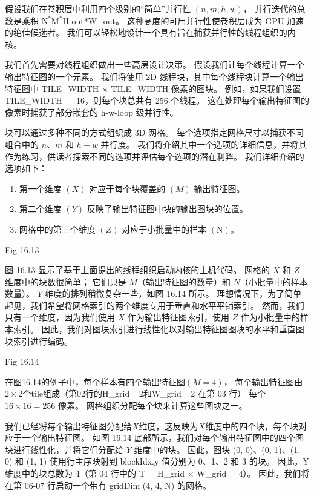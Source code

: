假设我们在卷积层中利用四个级别的“简单”并行性 $(n, m, h, w)$，
并行迭代的总数是乘积 $\mathrm{N}^{*} \mathrm{ M}^{*} \mathrm{H} \_$out*W\_out。 
这种高度的可用并行性使卷积层成为 GPU 加速的绝佳候选者。 我们可以轻松地设计一个具有旨在捕获并行性的线程组织的内核。

我们首先需要对线程组织做出一些高层设计决策。 假设我们让每个线程计算一个输出特征图的一个元素。 
我们将使用 2D 线程块，其中每个线程块计算一个输出特征图中 TILE\_WIDTH $\times$ TILE\_WIDTH 像素的图块。 
例如，如果我们设置 TILE\_WIDTH $=16$，则每个块总共有 256 个线程。 
这在处理每个输出特征图的像素时捕获了部分嵌套的 h-w-loop 级并行性。

块可以通过多种不同的方式组织成 3D 网格。 每个选项指定网格尺寸以捕获不同组合中的 $n、m$ 和 $h-w$ 并行度。 
我们将介绍其中一个选项的详细信息，并将其作为练习，供读者探索不同的选项并评估每个选项的潜在利弊。 我们详细介绍的选项如下：
\begin{enumerate}
   \item 第一个维度 $(X)$ 对应于每个块覆盖的 $(M)$ 输出特征图。

   \item 第二个维度 $(Y)$ 反映了输出特征图中块的输出图块的位置。

   \item 网格中的第三个维度 $(Z)$ 对应于小批量中的样本 $(\mathrm{N})$。
\end{enumerate}

{\color{red} Fig 16.13}

图 16.13 显示了基于上面提出的线程组织启动内核的主机代码。 网格的 $X$ 和 $Z$ 维度中的块数很简单； 
它们只是 $M$（输出特征图的数量）和 $N$（小批量中的样本数量）。 $Y$ 维度的排列稍微复杂一些，如图 16.14 所示。 
理想情况下，为了简单起见，我们希望将网格索引的两个维度专用于垂直和水平平铺索引。 
然而，我们只有一个维度，因为我们使用 $X$ 作为输出特征图索引，使用 $Z$ 作为小批量中的样本索引。 
因此，我们对图块索引进行线性化以对输出特征图图块的水平和垂直图块索引进行编码。

{\color{red} Fig 16.14}

在图16.14的例子中，每个样本有四个输出特征图$(M=4)$，
每个输出特征图由$2 \times 2$个tile组成（第02行的H\_grid =2和W\_grid =2 在第 03 行）
每个 $16 \times 16=256$ 像素。 网格组织分配每个块来计算这些图块之一。

我们已经将每个输出特征图分配给$X$维度，这反映为$X$维度中的四个块，每个块对应于一个输出特征图。 
如图 16.14 底部所示，我们对每个输出特征图中的四个图块进行线性化，并将它们分配给 $Y$ 维度中的块。 
因此，图块 (0, 0)、(0, 1)、(1, 0) 和 (1, 1) 使用行主序映射到 blockIdx.y 值分别为 0、1、2 和 3 的块。 
因此，Y 维度中的块总数为 4（第 04 行中的 T = H\_grid × W\_grid = 4）。 
因此，我们将在第 06-07 行启动一个带有 gridDim (4, 4, N) 的网格。

